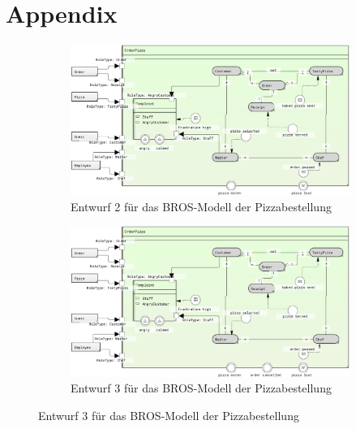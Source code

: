 \appendix
\chapter{Appendix}
\label{chap:appendix}

\begin{figure}
    
\end{figure}

\begin{figure}
    \centering
    \begin{subfigure}{0.8\textwidth}
        \centering
        \includegraphics[width=\textwidth,keepaspectratio]{../images/example/bros-rule3.png}%
        \caption{Entwurf 2 für das BROS-Modell der Pizzabestellung}%
        \label{fig:pizzaBros3}
    \end{subfigure}
    \begin{subfigure}{0.8\textwidth}
        \centering
        \includegraphics[width=\textwidth,keepaspectratio]{../images/example/bros-rule4.png}%
        \caption{Entwurf 3 für das BROS-Modell der Pizzabestellung}%

\end{subfigure}
\end{figure}

